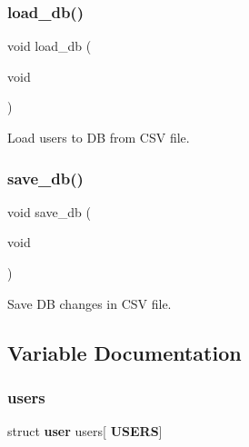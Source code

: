 \subsubsection{load\+\_\+db()}
{\footnotesize\ttfamily void load\+\_\+db (\begin{DoxyParamCaption}\item[{void}]{ }\end{DoxyParamCaption})}



Load users to DB from C\+SV file. 

\mbox{\label{auth_8h_afeb75f74451938ff9dc7617224f6fe3f}} 
\subsubsection{save\+\_\+db()}
{\footnotesize\ttfamily void save\+\_\+db (\begin{DoxyParamCaption}\item[{void}]{ }\end{DoxyParamCaption})}



Save DB changes in C\+SV file. 



\subsection{Variable Documentation}
\mbox{\label{auth_8h_ad1b6438b2448da2b01d9887f58f5fb66}} 
\subsubsection{users}
{\footnotesize\ttfamily struct \textbf{ user} users[\textbf{ U\+S\+E\+RS}]}

